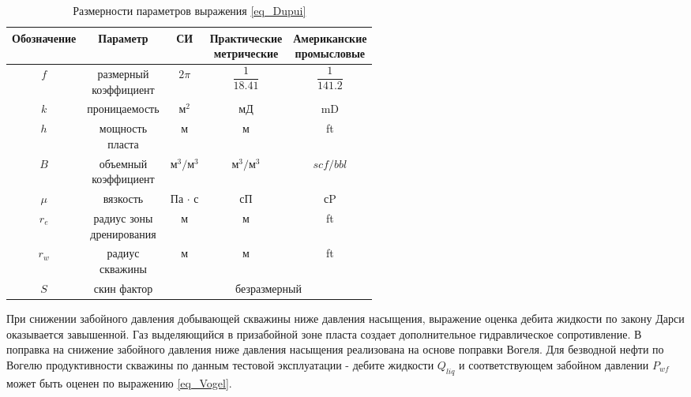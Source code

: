 \begin{table}[]
	\centering
	\caption{Размерности параметров выражения \ref{eq_Dupui}} \label{tab:dim_Dupui}
	\begin{tabular}{|c|c|c|c|c|}
		\hline
		Обозначение & Параметр   			        	& СИ           & \rnttab{Практические \\ метрические}     & \rnttab{Американские\\ промысловые} \\ \hline
		$f$        & \rnttab{размерный \\ коэффициент} & $2\pi$       & $\dfrac{1}{18.41}$     			      & $\dfrac{1}{141.2}$                      \\ \hline
		$k$        & проницаемость           		    & $\text{м}^2$ & мД                    					  & mD   							    \\ \hline
		$h$        & \rnttab{мощность \\ пласта}       & м            & м                      				  & ft   								    \\ \hline		
		$B$        & \rnttab{объемный \\ коэффициент}  & $\text{м}^3/\text{м}^3$    & $\text{м}^3/\text{м}^3$    & $scf/bbl$    						\\ \hline
		$\mu$      & вязкость                           & Па $\cdot$ с & сП                                       & сP                                  \\ \hline
		$r_e$      & \rnttab{радиус зоны \\ дренирования} & м & м                                       & ft                                  \\ \hline
		$r_w$      & \rnttab{радиус  \\ скважины} & м & м                                       & ft                                  \\ \hline
		$S$        & скин фактор 				   & \multicolumn{3}{c|}{безразмерный}                     \\ \hline
	\end{tabular}
\end{table}
 
 При снижении забойного давления добывающей скважины ниже давления насыщения, выражение оценка дебита жидкости по закону Дарси  оказывается завышенной. Газ выделяющийся в призабойной зоне пласта создает дополнительное гидравлическое сопротивление.  В \unf поправка на снижение забойного давления ниже давления насыщения реализована на основе поправки Вогеля. Для безводной нефти по Вогелю продуктивности скважины по данным тестовой эксплуатации - дебите жидкости $Q_{liq}$ и соответствующем забойном давлении $P_{wf}$ может быть оценен по выражению \ref{eq_Vogel}.
 
